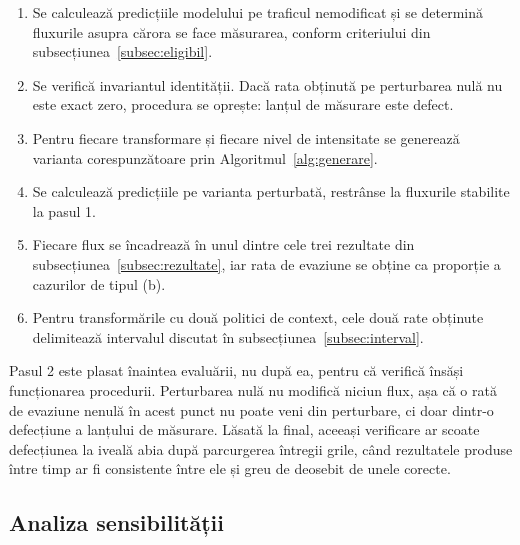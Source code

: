 \begin{algorithm}[H]
\caption{Măsurarea ratei de evaziune}\label{alg:masurare}
\begin{enumerate}\itemsep2pt
    \item Se calculează predicțiile modelului pe traficul nemodificat și se determină fluxurile asupra cărora se face măsurarea, conform criteriului din subsecțiunea~\ref{subsec:eligibil}.
    \item Se verifică invariantul identității. Dacă rata obținută pe perturbarea nulă nu este exact zero, procedura se oprește: lanțul de măsurare este defect.
    \item Pentru fiecare transformare și fiecare nivel de intensitate se generează varianta corespunzătoare prin Algoritmul~\ref{alg:generare}.
    \item Se calculează predicțiile pe varianta perturbată, restrânse la fluxurile stabilite la pasul 1.
    \item Fiecare flux se încadrează în unul dintre cele trei rezultate din subsecțiunea~\ref{subsec:rezultate}, iar rata de evaziune se obține ca proporție a cazurilor de tipul (b).
    \item Pentru transformările cu două politici de context, cele două rate obținute delimitează intervalul discutat în subsecțiunea~\ref{subsec:interval}.
\end{enumerate}
\end{algorithm}

Pasul 2 este plasat înaintea evaluării, nu după ea, pentru că verifică însăși funcționarea procedurii. Perturbarea nulă nu modifică niciun flux, așa că o rată de evaziune nenulă în acest punct nu poate veni din perturbare, ci doar dintr-o defecțiune a lanțului de măsurare. Lăsată la final, aceeași verificare ar scoate defecțiunea la iveală abia după parcurgerea întregii grile, când rezultatele produse între timp ar fi consistente între ele și greu de deosebit de unele corecte.


\subsection{Analiza sensibilității}\label{subsec:alg-sensibilitate}

